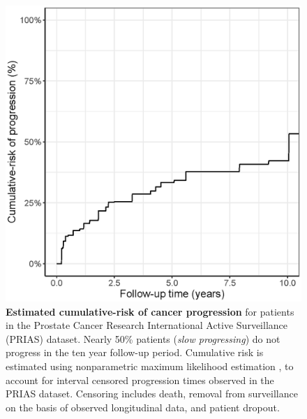 \begin{figure}
\centerline{\includegraphics[width=\columnwidth]{images/npmle_plot.eps}}
\caption{\textbf{Estimated cumulative-risk of cancer progression} for patients in the Prostate Cancer Research International Active Surveillance (PRIAS) dataset. Nearly 50\% patients (\textit{slow progressing}) do not progress in the ten year follow-up period. Cumulative risk is estimated using nonparametric maximum likelihood estimation \citep{turnbull1976empirical}, to account for interval censored progression times observed in the PRIAS dataset. Censoring includes death, removal from surveillance on the basis of observed longitudinal data, and patient dropout.}
\label{fig:npmle_plot}
\end{figure}

